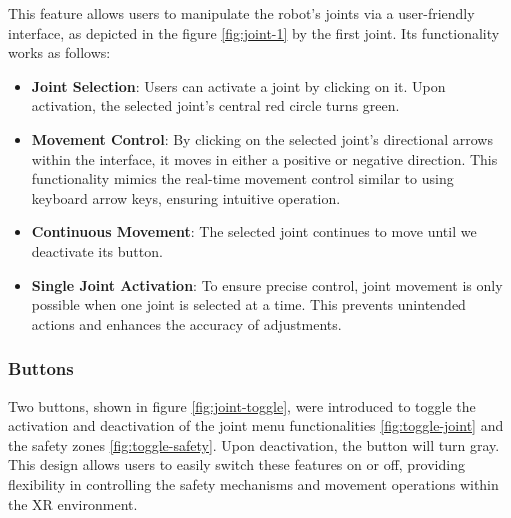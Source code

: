             This feature allows users to manipulate the robot's joints via a user-friendly interface, as depicted in the figure \ref{fig:joint-1} 
            by the first joint. Its functionality works as follows:


            \begin{itemize}
                \item \textbf{Joint Selection}: Users can activate a joint by clicking on it. Upon activation, the 
                selected joint's central red circle turns green.
                \item \textbf{Movement Control}: By clicking on the selected joint's directional arrows within the interface, it moves in either a 
                positive or negative direction. This functionality mimics the real-time movement control similar to using keyboard arrow keys, ensuring 
                intuitive operation.
                \item \textbf{Continuous Movement}: The selected joint continues to move until we deactivate its button.
                \item \textbf{Single Joint Activation}: To ensure precise control, joint movement is only possible when one joint is selected at a time. 
                This prevents unintended actions and enhances the accuracy of adjustments.
            \end{itemize}
        
        
        \subsubsection{Buttons}
        
            Two buttons, shown in figure \ref{fig:joint-toggle}, were introduced to toggle the activation and deactivation of the joint menu 
            functionalities \ref{fig:toggle-joint} and the safety zones \ref{fig:toggle-safety}. Upon deactivation, the button will turn gray. 
            This design allows users to easily switch these features on or off, providing flexibility in controlling the safety mechanisms and movement 
            operations within the \ac{XR} environment.
            
